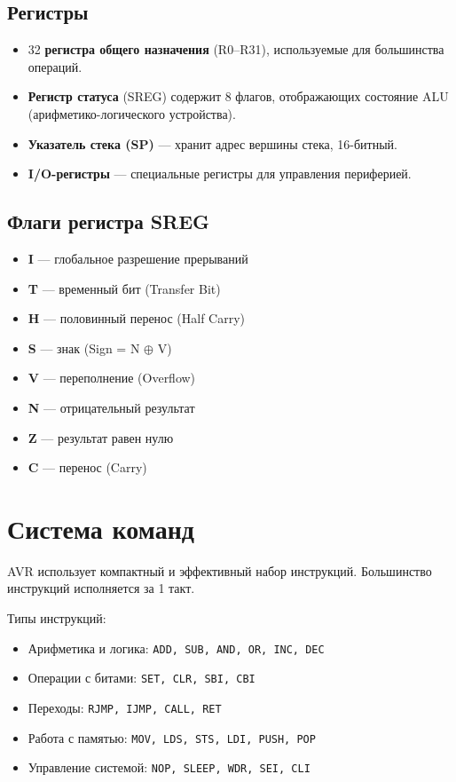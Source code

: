 \documentclass[a4paper,12pt]{article}
\begin{document}
\subsection{Регистры}
\begin{itemize}
    \item 32 \textbf{регистра общего назначения} (R0–R31), используемые для большинства операций.
    \item \textbf{Регистр статуса} (SREG) содержит 8 флагов, отображающих состояние ALU (арифметико-логического устройства).
    \item \textbf{Указатель стека (SP)} — хранит адрес вершины стека, 16-битный.
    \item \textbf{I/O-регистры} — специальные регистры для управления периферией.
\end{itemize}

\subsection{Флаги регистра SREG}
\begin{itemize}
    \item \textbf{I} — глобальное разрешение прерываний
    \item \textbf{T} — временный бит (Transfer Bit)
    \item \textbf{H} — половинный перенос (Half Carry)
    \item \textbf{S} — знак (Sign = N $\oplus$ V)
    \item \textbf{V} — переполнение (Overflow)
    \item \textbf{N} — отрицательный результат
    \item \textbf{Z} — результат равен нулю
    \item \textbf{C} — перенос (Carry)
\end{itemize}

\section{Система команд}
AVR использует компактный и эффективный набор инструкций. Большинство инструкций исполняется за 1 такт.

Типы инструкций:
\begin{itemize}
    \item Арифметика и логика: \texttt{ADD, SUB, AND, OR, INC, DEC}
    \item Операции с битами: \texttt{SET, CLR, SBI, CBI}
    \item Переходы: \texttt{RJMP, IJMP, CALL, RET}
    \item Работа с памятью: \texttt{MOV, LDS, STS, LDI, PUSH, POP}
    \item Управление системой: \texttt{NOP, SLEEP, WDR, SEI, CLI}
\end{itemize}
\end{document}
